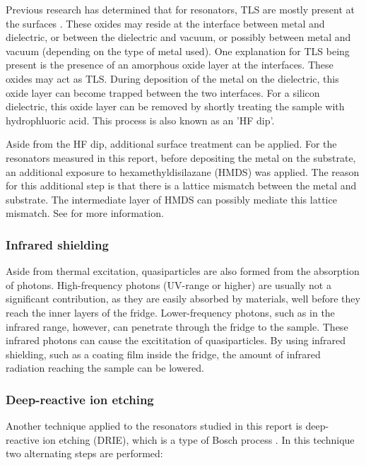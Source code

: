   Previous research has determined that for resonators, TLS are mostly present at the surfaces \cite{gao2008experimental}. These oxides may reside at the interface between metal and dielectric, or between the dielectric and vacuum, or possibly between metal and vacuum (depending on the type of metal used). One explanation for TLS being present is the presence of an amorphous oxide layer at the interfaces. These oxides may act as TLS. During deposition of the metal on the dielectric, this oxide layer can become trapped between the two interfaces. For a silicon dielectric, this oxide layer can be removed by shortly treating the sample with hydrophluoric acid. This process is also known as an 'HF dip'.

  Aside from the HF dip, additional surface treatment can be applied. For the resonators measured in this report, before depositing the metal on the substrate, an additional exposure to hexamethyldisilazane (HMDS) was applied. The reason for this additional step is that there is a lattice mismatch between the metal and substrate. The intermediate layer of HMDS can possibly mediate this lattice mismatch. See \cite{DRIE} for more information.


  \subsubsection{Infrared shielding}

  Aside from thermal excitation, quasiparticles are also formed from the absorption of photons. High-frequency photons (UV-range or higher) are usually not a significant contribution, as they are easily absorbed by materials, well before they reach the inner layers of the fridge. Lower-frequency photons, such as in the infrared range, however, can penetrate through the fridge to the sample. These infrared photons can cause the excititation of quasiparticles. By using infrared shielding, such as a coating film inside the fridge, the amount of infrared radiation reaching the sample can be lowered.



  \subsubsection{Deep-reactive ion etching}

  Another technique applied to the resonators studied in this report is deep-reactive ion etching (DRIE), which is a type of Bosch process \cite{DRIE}. In this technique two alternating steps are performed:

